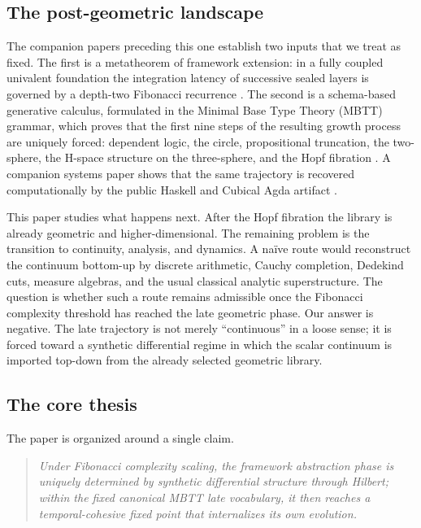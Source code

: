 \documentclass[11pt]{article}
\theoremstyle{plain}
\theoremstyle{definition}
\theoremstyle{remark}
\begin{document}
\subsection{The post-geometric landscape}

The companion papers preceding this one establish two inputs that we treat as fixed. The first is a metatheorem of framework extension: in a fully coupled univalent foundation the integration latency of successive sealed layers is governed by a depth-two Fibonacci recurrence \citep{lande-coherence}. The second is a schema-based generative calculus, formulated in the Minimal Base Type Theory (MBTT) grammar, which proves that the first nine steps of the resulting growth process are uniquely forced: dependent logic, the circle, propositional truncation, the two-sphere, the H-space structure on the three-sphere, and the Hopf fibration \citep{lande-generative}. A companion systems paper shows that the same trajectory is recovered computationally by the public Haskell and Cubical Agda artifact \citep{lande-automation,lande-repo}.

This paper studies what happens next. After the Hopf fibration the library is already geometric and higher-dimensional. The remaining problem is the transition to continuity, analysis, and dynamics. A naïve route would reconstruct the continuum bottom-up by discrete arithmetic, Cauchy completion, Dedekind cuts, measure algebras, and the usual classical analytic superstructure. The question is whether such a route remains admissible once the Fibonacci complexity threshold has reached the late geometric phase. Our answer is negative. The late trajectory is not merely ``continuous'' in a loose sense; it is forced toward a synthetic differential regime in which the scalar continuum is imported top-down from the already selected geometric library.

\subsection{The core thesis}

The paper is organized around a single claim.

\begin{quote}
\emph{Under Fibonacci complexity scaling, the framework abstraction phase is uniquely determined by synthetic differential structure through Hilbert; within the fixed canonical MBTT late vocabulary, it then reaches a temporal-cohesive fixed point that internalizes its own evolution.}
\end{quote}
\end{document}
